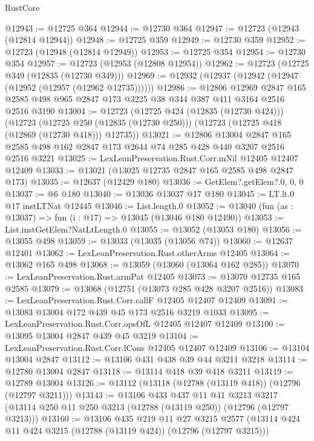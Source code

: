 \begin{lexlean}{RustCore}
\begin{coremodule}
@12943 := @12725 @364
@12944 := @12730 @364
@12947 := @12723 (@12943 (@12814 @12944))
@12948 := @12725 @359
@12949 := @12730 @359
@12952 := @12723 (@12948 (@12814 @12949))
@12953 := @12725 @354
@12954 := @12730 @354
@12957 := @12723 (@12953 (@12808 @12954))
@12962 := @12723 (@12725 @349 (@12835 (@12730 @349)))
@12969 := @12932 (@12937 (@12942 (@12947 (@12952 (@12957 (@12962 @12735))))))
@12986 := @12806
    @12969
    @2847
    @165
    @2585
    @498
    @965
    @2847
    @173
    @3225
    @38
    @344
    @387
    @411
    @3164
    @2516
    @2516
    @3190
@13004 := @12723
    (@12725 @424 (@12835 (@12730 @424)))
    (@12723
      (@12725 @250 (@12835 (@12730 @250)))
      (@12723 (@12725 @418 (@12869 (@12730 @418))) @12735))
@13021 := @12806
    @13004
    @2847
    @165
    @2585
    @498
    @162
    @2847
    @173
    @2644
    @74
    @285
    @428
    @440
    @3207
    @2516
    @2516
    @3221
@13025 := LexLeanPreservation.Rust.Corr.mNil @12405 @12407 @12409
@13033 := @13021 (@13025 @12735 @2847 @165 @2585 @498 @2847 @173)
@13035 := @12637 (@12429 @180)
@13036 := GetElem?.getElem?.{0, 0, 0}
@13037 := @6 @180
@13040 := @13036 @13037 @17 @180
@13045 := LT.lt.{0} @17 instLTNat @12445
@13046 := List.length.{0}
@13052 := @13040 (fun (as : @13037) => fun (i : @17) => @13045 (@13046 @180 @12490))
@13053 := List.instGetElem?NatLtLength.{0}
@13055 := @13052 (@13053 @180)
@13056 := @13055 @498
@13059 := @13033 (@13035 (@13056 @74))
@13060 := @12637 @12401
@13062 := LexLeanPreservation.Rust.otherArms @12405
@13064 := @13062 @165 @498
@13068 := @13059 (@13060 (@13064 @162 @285))
@13070 := LexLeanPreservation.Rust.armPat @12405
@13073 := @13070 @12735 @165 @2585
@13079 := @13068 (@12751 (@13073 @285 @428 @3207 @2516))
@13083 := LexLeanPreservation.Rust.Corr.callF @12405 @12407 @12409
@13091 := @13083 @13004 @172 @439 @45 @173 @2516 @3219 @1033
@13095 := LexLeanPreservation.Rust.Corr.opsOfL @12405 @12407 @12409
@13100 := @13095 @13004 @2847 @439 @45 @3219
@13104 := LexLeanPreservation.Rust.Corr.lCons @12405 @12407 @12409
@13106 := @13104 @13004 @2847
@13112 := @13106 @431 @438 @39 @44 @3211 @3218
@13114 := @12780 @13004 @2847
@13118 := @13114 @418 @39 @418 @3211
@13119 := @12789 @13004
@13126 := @13112 (@13118 (@12788 (@13119 @418)) (@12796 (@12797 @3211)))
@13143 := @13106
    @433
    @437
    @11
    @41
    @3213
    @3217
    (@13114 @250 @11 @250 @3213 (@12788 (@13119 @250)) (@12796 (@12797 @3213)))
@13160 := @13106
    @435
    @219
    @11
    @27
    @3215
    @2577
    (@13114 @424 @11 @424 @3215 (@12788 (@13119 @424)) (@12796 (@12797 @3215)))

\end{coremodule}
\end{lexlean}
